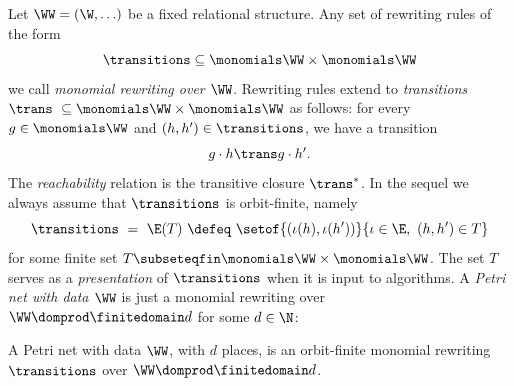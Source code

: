 Let $\WW = (\W, \ldots)$ be a fixed relational structure.
Any set of rewriting rules of the form
\[
\transitions \subseteq \monomials \WW \times \monomials \WW
\]
we call \emph{monomial rewriting over $\WW$}.
Rewriting rules extend to \emph{transitions} $\trans \ \subseteq \monomials \WW \times \monomials \WW$ as follows:
for every $g\in\monomials \WW$ and $(h, h') \in \transitions$, we have a transition
\[
g \cdot h \trans g \cdot h'.
\]
The \emph{reachability} relation is the transitive closure $\trans^*$.
In the sequel we always assume that $\transitions$ is orbit-finite, namely
\[
\transitions \ = \ \E(T) \ \defeq \ \setof{(\iota(h), \iota(h'))}{\iota \in \E, \ (h,h')\in T}
\]
for some finite set $T\subseteqfin \monomials \WW \times \monomials \WW$.
The set $T$ serves as a \emph{presentation} of $\transitions$ when it is input to algorithms.
A \emph{Petri net with data $\WW$} is just a monomial rewriting over
$\WW\domprod \finitedomain d$ for some $d\in\N$:

\begin{definition}
A Petri net with data $\WW$, with $d$ places, is an orbit-finite monomial rewriting $\transitions$ 
over $\WW\domprod \finitedomain d$.
\end{definition}

